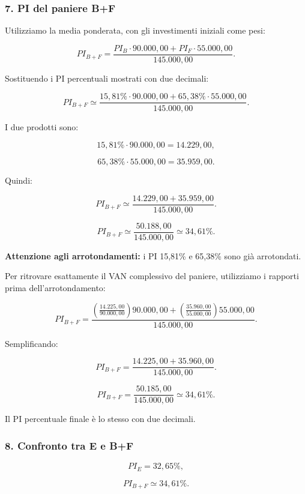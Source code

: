 \subsubsection*{7. PI del paniere B+F}

\noindent Utilizziamo la media ponderata,
con gli investimenti iniziali come pesi:

\[
PI_{B+F}
=
\frac{
PI_B\cdot90.000{,}00
+
PI_F\cdot55.000{,}00
}{
145.000{,}00
}.
\]

\noindent Sostituendo i PI percentuali
mostrati con due decimali:

\[
PI_{B+F}
\simeq
\frac{
15{,}81\%\cdot90.000{,}00
+
65{,}38\%\cdot55.000{,}00
}{
145.000{,}00
}.
\]

\noindent I due prodotti sono:

\[
15{,}81\%\cdot90.000{,}00
=
14.229{,}00,
\]

\[
65{,}38\%\cdot55.000{,}00
=
35.959{,}00.
\]

\noindent Quindi:

\[
PI_{B+F}
\simeq
\frac{14.229{,}00+35.959{,}00}
{145.000{,}00}.
\]

\[
PI_{B+F}
\simeq
\frac{50.188{,}00}{145.000{,}00}
\simeq
\boxed{34{,}61\%}.
\]

\medskip

\noindent \textbf{Attenzione agli arrotondamenti:}
i PI 15,81\% e 65,38\%
sono già arrotondati.

\noindent Per ritrovare esattamente
il VAN complessivo del paniere,
utilizziamo i rapporti prima
dell'arrotondamento:

\[
PI_{B+F}
=
\frac{
\left(\frac{14.225{,}00}{90.000{,}00}\right)
90.000{,}00
+
\left(\frac{35.960{,}00}{55.000{,}00}\right)
55.000{,}00
}{
145.000{,}00
}.
\]

\noindent Semplificando:

\[
PI_{B+F}
=
\frac{
14.225{,}00+35.960{,}00
}{
145.000{,}00
}.
\]

\[
PI_{B+F}
=
\frac{50.185{,}00}{145.000{,}00}
\simeq
\boxed{34{,}61\%}.
\]

\noindent Il PI percentuale finale
è lo stesso con due decimali.


\subsubsection*{8. Confronto tra E e B+F}

\[
PI_E=32{,}65\%,
\]

\[
PI_{B+F}\simeq34{,}61\%.
\]

